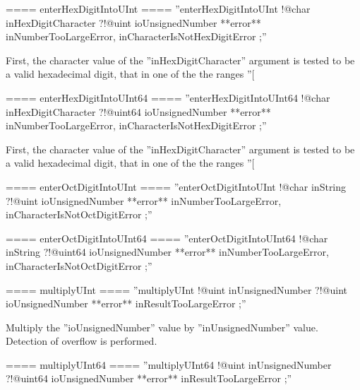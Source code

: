 {==== enterHexDigitIntoUInt ====
''enterHexDigitIntoUInt !@char inHexDigitCharacter ?!@uint ioUnsignedNumber **error** inNumberTooLargeError, inCharacterIsNotHexDigitError ;''

First, the character value of the ''inHexDigitCharacter'' argument is tested to be a valid hexadecimal digit, that in one of the the ranges ''[%

==== enterHexDigitIntoUInt64 ====
''enterHexDigitIntoUInt64 !@char inHexDigitCharacter ?!@uint64 ioUnsignedNumber **error** inNumberTooLargeError, inCharacterIsNotHexDigitError ;''

First, the character value of the ''inHexDigitCharacter'' argument is tested to be a valid hexadecimal digit, that in one of the the ranges ''[%

==== enterOctDigitIntoUInt ====
''enterOctDigitIntoUInt !@char inString ?!@uint ioUnsignedNumber **error** inNumberTooLargeError, inCharacterIsNotOctDigitError ;''

==== enterOctDigitIntoUInt64 ====
''enterOctDigitIntoUInt64 !@char inString ?!@uint64 ioUnsignedNumber **error** inNumberTooLargeError, inCharacterIsNotOctDigitError ;''

==== multiplyUInt ====
''multiplyUInt !@uint inUnsignedNumber ?!@uint ioUnsignedNumber **error** inResultTooLargeError ;''

Multiply the ''ioUnsignedNumber'' value by ''inUnsignedNumber'' value. Detection of overflow is performed.

==== multiplyUInt64 ====
''multiplyUInt64 !@uint inUnsignedNumber ?!@uint64 ioUnsignedNumber **error** inResultTooLargeError ;''

}
